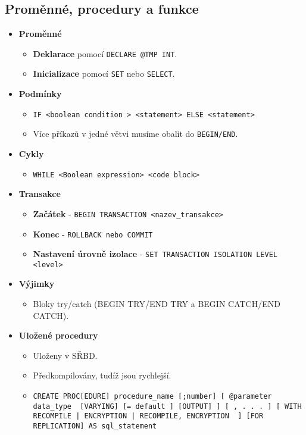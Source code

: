 \subsection{Proměnné, procedury a funkce}
\begin{itemize}
    \item \textbf{Proměnné}
          \begin{itemize}
              \item \textbf{Deklarace} pomocí \texttt{DECLARE @TMP INT}.
              \item \textbf{Inicializace} pomocí \texttt{SET} nebo \texttt{SELECT}.
          \end{itemize}

    \item \textbf{Podmínky}
          \begin{itemize}
              \item \texttt{IF <boolean condition > <statement> ELSE <statement>}
              \item Více příkazů v jedné větvi musíme obalit do \texttt{BEGIN/END}.
          \end{itemize}


    \item \textbf{Cykly}
          \begin{itemize}
              \item \texttt{WHILE <Boolean expression> <code block>}
          \end{itemize}


    \item \textbf{Transakce}
          \begin{itemize}
              \item \textbf{Začátek} - \texttt{BEGIN TRANSACTION <nazev\_transakce>}
              \item \textbf{Konec} - \texttt{ROLLBACK nebo COMMIT}
              \item \textbf{Nastavení úrovně izolace} - \texttt{SET TRANSACTION ISOLATION LEVEL <level>}
          \end{itemize}


    \item \textbf{Výjimky}
          \begin{itemize}
              \item Bloky try/catch (BEGIN TRY/END TRY a BEGIN CATCH/END CATCH).
          \end{itemize}


    \item \textbf{Uložené procedury}
          \begin{itemize}
              \item Uloženy v SŘBD.
              \item Předkompilovány, tudíž jsou rychlejší.
              \item \texttt{CREATE PROC[EDURE] procedure\_name [;number] [{ @parameter data\_type } [VARYING] [= default ] [OUTPUT] ] [ , . . . ] [ WITH { RECOMPILE | ENCRYPTION | RECOMPILE, ENCRYPTION } ] [FOR REPLICATION] AS sql\_statement}
          \end{itemize}



\end{itemize}
